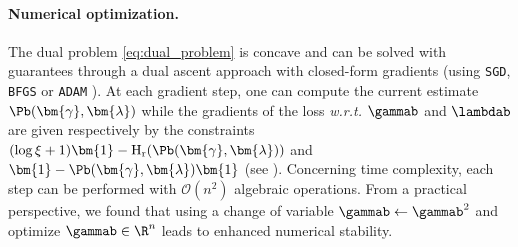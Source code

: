 \paragraph{Numerical optimization.} The dual problem \eqref{eq:dual_problem} is concave and can be solved with guarantees through a dual ascent approach with closed-form gradients (using \eg \texttt{SGD}, \texttt{BFGS} \cite{liu1989limited} or \texttt{ADAM} \cite{kingma2014adam}).
At each gradient step, one can compute the current estimate $\Pb(\bm{\gamma}, \bm{\lambda})$ while the gradients of the loss \textit{w.r.t.} $\gammab$ and $\lambdab$ are given respectively by the constraints $(\log{\xi}+1)
\bm{1} - \operatorname{H}_{\mathrm{r}}(\Pb(\bm{\gamma}, \bm{\lambda}))$ and $ \bm{1} - \Pb(\bm{\gamma}, \bm{\lambda}) \bm{1}$ (see \eg \cite[Proposition 6.1.1]{bertsekas1997nonlinear}).
Concerning time
complexity, each step can be performed with $\mathcal{O}(n^2)$ algebraic
operations. From a practical perspective, we found that using a change of variable $\gammab \leftarrow \gammab^2$ and optimize $\gammab \in \R^n$ leads to enhanced numerical stability.

